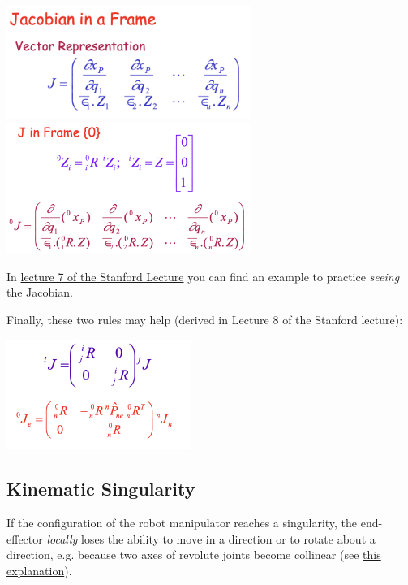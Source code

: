 \begin{center}
	\includegraphics[width=8cm]{sections/imgs/4_jacobian_in_a_frame.png}
	\hfill
	\includegraphics[width=8cm]{sections/imgs/4_J_in_frame_0.png}
\end{center}

In \href{https://youtu.be/6SRTAoyzC6A?t=2235}{lecture 7 of the Stanford Lecture} you can find an example to practice \textit{seeing} the Jacobian.

Finally, these two rules may help (derived in Lecture 8 of the Stanford lecture):
\begin{center}
	\includegraphics[width=6cm]{sections/imgs/4_jacobian_relate_frames.png}
\end{center}

\subsection{Kinematic Singularity}

If the configuration of the robot manipulator reaches a singularity, the end-effector \textit{locally} loses the ability to move in a direction or to rotate about a direction, e.g. because two axes of revolute joints become collinear (see \href{https://youtu.be/XrNdB4k5kUk?t=575}{this explanation}).

